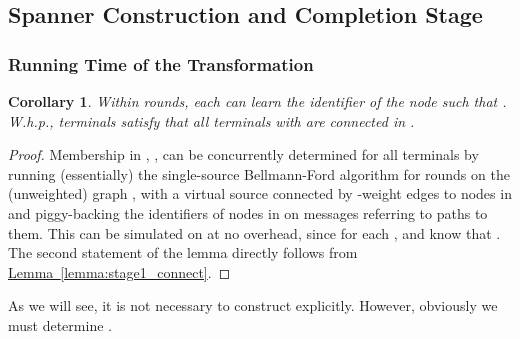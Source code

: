 \documentclass[letterpaper,11pt]{article}
\newtheorem{corollary}[theorem]{Corollary}
\newcommand{\namedref}[2]{\hyperref[#2]{#1~\ref*{#2}}}
\newcommand{\lemmaref}[1]{\namedref{Lemma}{#1}}
\begin{document}
\subsection{Spanner Construction and Completion Stage}\label{sec:spanner}




\subsubsection*{Running Time of the Transformation}
\begin{corollary}\label{coro:stage2_group}
Within  rounds, each  can learn
the identifier of the node  such that . W.h.p.,
terminals  satisfy that all terminals  with
 are connected in .
\end{corollary}
\begin{proof}
Membership in , , can be concurrently determined for all
terminals  by running (essentially) the single-source Bellmann-Ford
algorithm for  rounds on the (unweighted) graph ,
with a virtual source connected by -weight edges to nodes in  and
piggy-backing the identifiers of nodes in  on messages referring to
paths to them. This can be simulated on  at no overhead, since for each
,  and  know that . The second statement of
the lemma directly follows from \lemmaref{lemma:stage1_connect}.
\end{proof}

As we will see, it is not necessary to construct  explicitly. However,
obviously we must determine .
\end{document}
